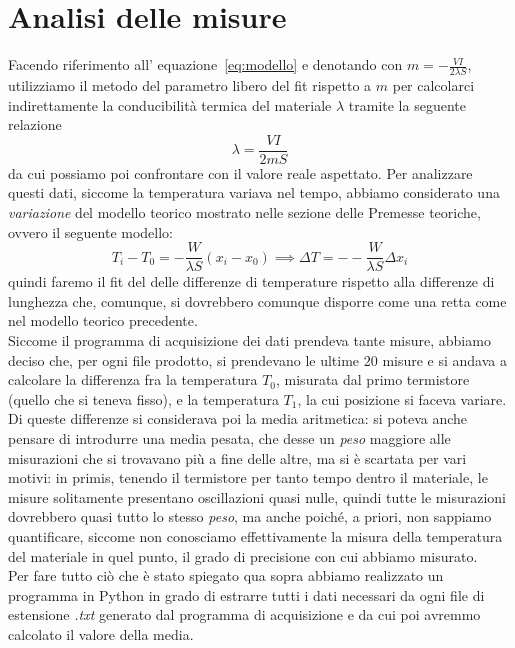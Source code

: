 \documentclass{article}
\begin{document}
\section{Analisi delle misure}
Facendo riferimento all' equazione~\ref{eq:modello} e denotando con $m = -\frac{VI}{2 \lambda S}$, utilizziamo il metodo del parametro libero del fit rispetto a $m$ per calcolarci indirettamente la conducibilità termica del materiale $\lambda$ tramite la seguente relazione
\begin{equation}
	\lambda = \frac{VI}{2mS} \label{eq:lambda}
\end{equation}
da cui possiamo poi confrontare con il valore reale aspettato.
Per analizzare questi dati, siccome la temperatura variava nel tempo, abbiamo considerato una \emph{variazione} del modello teorico mostrato nelle sezione delle Premesse teoriche, ovvero il seguente modello:
\begin{equation}
	T_i - T_0 = -\frac{W}{\lambda S}(x_i-x_0) \implies \Delta T = --\frac{W}{\lambda S}\Delta x_i
\end{equation}
quindi faremo il fit del delle differenze di temperature rispetto alla differenze di lunghezza che, comunque, si dovrebbero comunque disporre come una retta come nel modello teorico precedente. \\
Siccome il programma di acquisizione dei dati prendeva tante misure, abbiamo deciso che, per ogni file prodotto, si prendevano le ultime $20$ misure e si andava a calcolare la differenza fra la temperatura $T_0$, misurata dal primo termistore (quello che si teneva fisso), e la temperatura $T_1$, la cui posizione si faceva variare. Di queste differenze si considerava poi la media aritmetica: si poteva anche pensare di introdurre una media pesata, che desse un \emph{peso} maggiore alle misurazioni che si trovavano più a fine delle altre, ma si è scartata per vari motivi: in primis, tenendo il termistore per tanto tempo dentro il materiale, le misure solitamente presentano oscillazioni quasi nulle, quindi tutte le misurazioni dovrebbero quasi tutto lo stesso \emph{peso}, ma anche poiché, a priori, non sappiamo quantificare, siccome non conosciamo effettivamente la misura della temperatura del materiale in quel punto, il grado di precisione con cui abbiamo misurato. \\
Per fare tutto ciò che è stato spiegato qua sopra abbiamo realizzato un programma in Python in grado di estrarre tutti i dati necessari da ogni file di estensione \emph{.txt} generato dal programma di acquisizione e da cui poi avremmo calcolato il valore della media.
\end{document}
